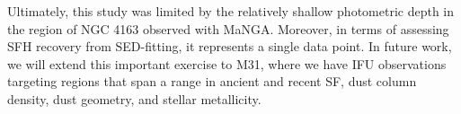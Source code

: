 \documentclass[preprint2]{aastex62}
\begin{document}
Ultimately, this study was limited by the relatively shallow photometric depth in the region of NGC 4163 observed with MaNGA. Moreover, in terms of assessing SFH recovery from SED-fitting, it represents a single data point. In future work, we will extend this important exercise to M31, where we have IFU observations targeting regions that span a range in ancient and recent SF, dust column density, dust geometry, and stellar metallicity.




\end{document}
